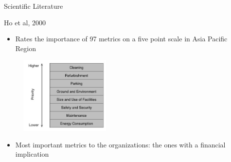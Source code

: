 \begin{frame}{Scientific Literature}
	\vspace{-0.7cm}
	\begin{block}{Ho et al, 2000}
		\begin{itemize}
			\item Rates the importance of 97 metrics on a five point scale in Asia Pacific Region
		\end{itemize}

		\begin{figure}
		  \centering
		  \includegraphics[width=0.4\textwidth]{images/MeasurementCatPriority.jpg}
		  \label{fig:MeasurementCatPriority}
		\end{figure}

		\begin{itemize}
			\item Most important metrics to the organizations: the ones with a financial implication
		\end{itemize}
	\end{block}
\end{frame}


